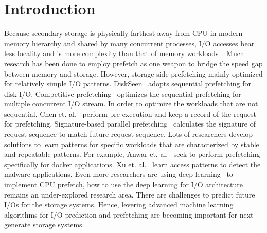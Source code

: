 \section{Introduction}

Because secondary storage is physically farthest away from CPU in modern memory hierarchy
and shared by many concurrent processes,
I/O accesses bear less locality and is more complexity than that of memory workloads~\cite{yang1992novel}.
Much research has been done to employ prefetch as one weapon to bridge the speed gap between memory and storage.
However, storage side prefetching mainly optimized for relatively simple I/O patterns.
DiskSeen~\cite{ding2007diskseen} adopts sequential prefetching for disk I/O.
Competitive prefetching~\cite{li2007competitive} optimizes the sequential prefetching for multiple concurrent I/O stream.
In order to optimize the workloads that are not sequential,
Chen et. al.~\cite{chen2008hiding} perform pre-execution and keep a record of the request for prefetching.
Signature-based parallel prefetching~\cite{byna2008parallel} calculates the signature of request sequence to match future request sequence. %
Lots of researchers develop solutions to learn patterns for
specific workloads that are characterized by stable and repeatable patterns.
For example, Anwar et. al.~\cite{anwar2018improving} seek to perform
prefetching specifically for docker applications. %
Xu et. al.~\cite{xu2017malware} learn access patterns to detect
the malware applications.
Even more researchers are using deep learning~\cite{hashemi2018learning} to implement CPU prefetch,
how to use the deep learning for I/O architecture remains an under-explored research area.
There are challenges to predict future I/Os for the storage systems.
Hence, levering advanced machine learning algorithms for I/O prediction and prefetching
are becoming important for next generate storage systems.

